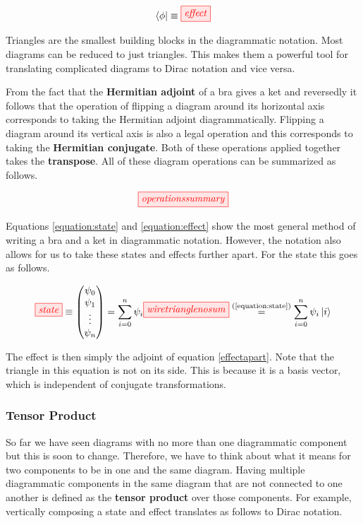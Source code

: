 \documentclass[]{article}
\newcommand{\equaltext}[1]{\ensuremath{\stackrel{\text{#1}}{=}}}
\begin{document}
\begin{equation}
\label{equation:effect}
\bra{\phi} \equiv \tikzfig{effect}
\end{equation}

Triangles are the smallest building blocks in the diagrammatic notation. Most diagrams can be reduced to just triangles. This makes them a powerful tool for translating complicated diagrams to Dirac notation and vice versa.

From the fact that the \textbf{Hermitian adjoint} of a bra gives a ket and reversedly it follows that the operation of flipping a diagram around its horizontal axis corresponds to taking the Hermitian adjoint diagrammatically. Flipping a diagram around its vertical axis is also a legal operation and this corresponds to taking the \textbf{Hermitian conjugate}. Both of these operations applied together takes the \textbf{transpose}. All of these diagram operations can be summarized as follows.

\begin{equation}
\tikzfig{operationssummary}
\end{equation}

Equations \ref{equation:state} and \ref{equation:effect} show the most general method of writing a bra and a ket in diagrammatic notation. However, the notation also allows for us to take these states and effects further apart. For the state this goes as follows. 

\begin{equation}
\label{effectapart}
\tikzfig{state} \equiv
\begin{pmatrix}
\psi_0 \\
\psi_1 \\
\vdots \\
\psi_n
\end{pmatrix} = \sum\limits_{i=0}^{n} \psi_i \tikzfig{wiretrianglenosum} \equaltext{(\ref{equation:state})} \sum\limits_{i=0}^{n} \psi_i \ket{i}
\end{equation}

The effect is then simply the adjoint of equation \ref{effectapart}. Note that the triangle in this equation is not on its side. This is because it is a basis vector, which is independent of conjugate transformations. 

\subsubsection{Tensor Product}
\label{section:tensorproduct}
So far we have seen diagrams with no more than one diagrammatic component but this is soon to change. Therefore, we have to think about what it means for two components to be in one and the same diagram. Having multiple diagrammatic components in the same diagram that are not connected to one another is defined as the \textbf{tensor product} over those components. For example, vertically composing a state and effect translates as follows to Dirac notation.
\end{document}
